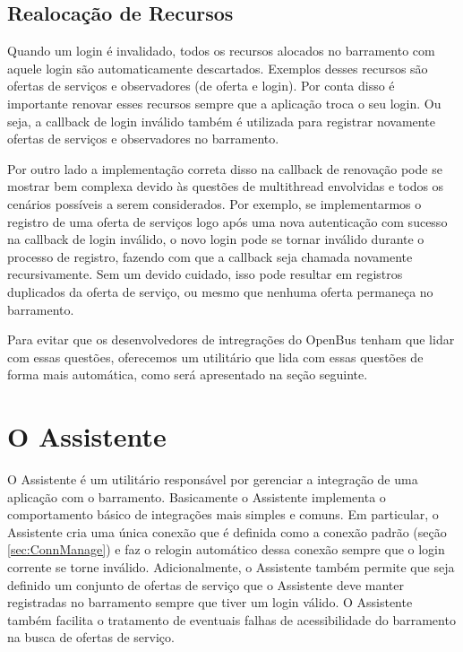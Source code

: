
\subsection{Realocação de Recursos}

Quando um login é invalidado, todos os recursos alocados no barramento com aquele login são automaticamente descartados.
Exemplos desses recursos são ofertas de serviços e observadores (de oferta e login).
Por conta disso é importante renovar esses recursos sempre que a aplicação troca o seu login.
Ou seja, a callback de login inválido também é utilizada para registrar novamente ofertas de serviços e observadores no barramento.

Por outro lado a implementação correta disso na callback de renovação pode se mostrar bem complexa devido às questões de multithread envolvidas e todos os cenários possíveis a serem considerados.
Por exemplo, se implementarmos o registro de uma oferta de serviços logo após uma nova autenticação com sucesso na callback de login inválido, o novo login pode se tornar inválido durante o processo de registro, fazendo com que a callback seja chamada novamente recursivamente.
Sem um devido cuidado, isso pode resultar em registros duplicados da oferta de serviço, ou mesmo que nenhuma oferta permaneça no barramento.

Para evitar que os desenvolvedores de intregrações do OpenBus tenham que lidar com essas questões, oferecemos um utilitário que lida com essas questões de forma mais automática, como será apresentado na seção seguinte.

\section{O Assistente} \label{sec:assistant}

O Assistente é um utilitário responsável por gerenciar a integração de uma aplicação com o barramento.
Basicamente o Assistente implementa o comportamento básico de integrações mais simples e comuns.
Em particular, o Assistente cria uma única conexão que é definida como a conexão padrão (seção \ref{sec:ConnManage}) e faz o relogin automático dessa conexão sempre que o login corrente se torne inválido.
Adicionalmente, o Assistente também permite que seja definido um conjunto de ofertas de serviço que o Assistente deve manter registradas no barramento sempre que tiver um login válido.
O Assistente também facilita o tratamento de eventuais falhas de acessibilidade do barramento na busca de ofertas de serviço.

